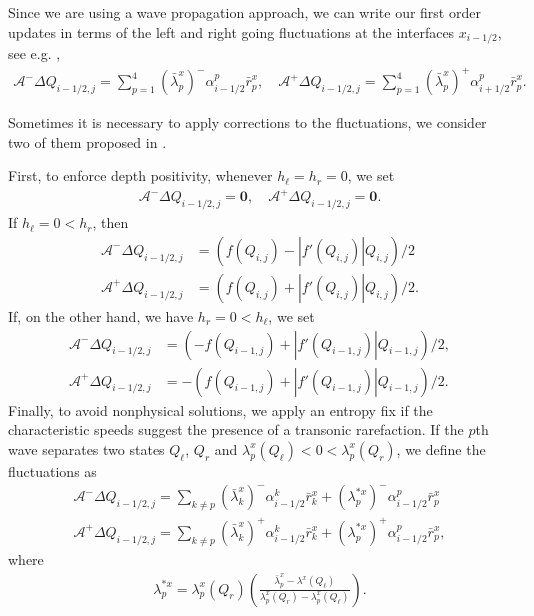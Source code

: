 \documentclass[12pt]{article}
\begin{document}
Since we are using a wave propagation approach, we can write our first order updates in terms of the left and right going fluctuations at the interfaces $x_{i-1/2}$, see e.g. \cite[Section 15.3]{leveque2002finite},
\begin{align}
    \mathcal{A}^{-}\Delta Q_{i-1/2,j}=\sum_{p=1}^4(\bar{\lambda}^x_p)^{-}\alpha^p_{i-1/2}\bar{r}^x_p, \quad
    \mathcal{A}^{+}\Delta Q_{i-1/2,j}=\sum_{p=1}^4(\bar{\lambda}^x_p)^{+}\alpha^p_{i+1/2}\bar{r}^x_p.
\end{align}

Sometimes it is necessary to apply corrections to the fluctuations, we consider two of them proposed in \cite{monthe1999positivity}.

First, to enforce depth positivity, whenever $h_\ell=h_r=0$,  we set 
\begin{align}
    \mathcal{A}^{-}\Delta Q_{i-1/2,j}=\mathbf{0},\quad \mathcal{A}^{+}\Delta Q_{i-1/2,j}=\mathbf{0}.
\end{align}
If $h_\ell=0<h_r$, then
\begin{align}
    \mathcal{A}^{-}\Delta Q_{i-1/2,j}&=(f(Q_{i,j})-|f'(Q_{i,j})|Q_{i,j})/2\\%
    \mathcal{A}^{+}\Delta Q_{i-1/2,j}&=(f(Q_{i,j})+|f'(Q_{i,j})|Q_{i,j})/2.
\end{align}
If, on the other hand, we have $h_r=0<h_\ell$, we set
\begin{align}
    \mathcal{A}^{-}\Delta Q_{i-1/2,j}&=(-f(Q_{i-1,j})+|f'(Q_{i-1,j})|Q_{i-1,j})/2,\\
    \mathcal{A}^{+}\Delta Q_{i-1/2,j}&=-(f(Q_{i-1,j})+|f'(Q_{i-1,j})|Q_{i-1,j})/2.%
\end{align}
Finally, to avoid nonphysical solutions, we apply an entropy fix if the characteristic speeds suggest the presence of a transonic rarefaction.
If the $p$th wave separates two states $Q_\ell$, $Q_r$ and $\lambda^x_p(Q_\ell)<0<\lambda^x_p(Q_r)$, we define the fluctuations as
\begin{align}
    \mathcal{A}^{-}\Delta Q_{i-1/2,j}=\sum_{k\neq p}(\bar{\lambda}^x_k)^{-}\alpha^k_{i-1/2}\bar{r}^x_k+(\lambda^{*x}_p)^{-}\alpha^p_{i-1/2}\bar{r}^x_p\\
    \mathcal{A}^{+}\Delta Q_{i-1/2,j}=\sum_{k\neq p}(\bar{\lambda}^x_k)^{+}\alpha^k_{i-1/2}\bar{r}^x_k+(\lambda^{*x}_p)^{+}\alpha^p_{i-1/2}\bar{r}^x_p,
\end{align}
where
\begin{align}
    \lambda^{*x}_p=\lambda^x_p(Q_r)\left(\frac{\bar{\lambda}^x_p-\lambda^x(Q_\ell)}{\lambda^x_p(Q_r)-\lambda^x_p(Q_\ell)}\right).
\end{align}
\end{document}
